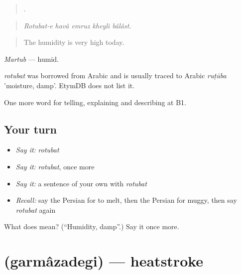 \begin{quote}
    .
\end{quote}

\begin{quote}
\emph{Rotubat-e havâ emruz kheyli bâlâst.}
\end{quote}

\begin{quote}
The humidity is very high today.
\end{quote}

\emph{Martub} — humid.

\begin{cousinweb}
\emph{rotubat} was borrowed from Arabic and is usually traced to Arabic \emph{ruṭūba} 'moisture, damp'. EtymDB does not list it.
\end{cousinweb}

\begin{grammarlens}[title={What you've built}]
One more word for telling, explaining and describing at B1.
\end{grammarlens}

\subsection*{Your turn}
\begin{itemize}
\raggedright
  \item \emph{Say it:} \emph{rotubat}
  \item \emph{Say it:} \emph{rotubat}, once more
  \item \emph{Say it:} a sentence of your own with \emph{rotubat}
  \item \emph{Recall:} say the Persian for to melt, then the Persian for muggy, then say \emph{rotubat} again
\end{itemize}

\begin{tcolorbox}[breakable,colback=teal!4,colframe=teal!35!black,title={Before you move on}]
What does  mean? (\textquotedblleft{}Humidity, damp\textquotedblright{}.) Say it once more.
\end{tcolorbox}
\section[\texorpdfstring{\fa{گرمازدگی} (garmâzadegi)}{گرمازدگی (garmâzadegi)}]{ (garmâzadegi) — heatstroke}

\label{lesson:FA-C477-garmazadegi}



